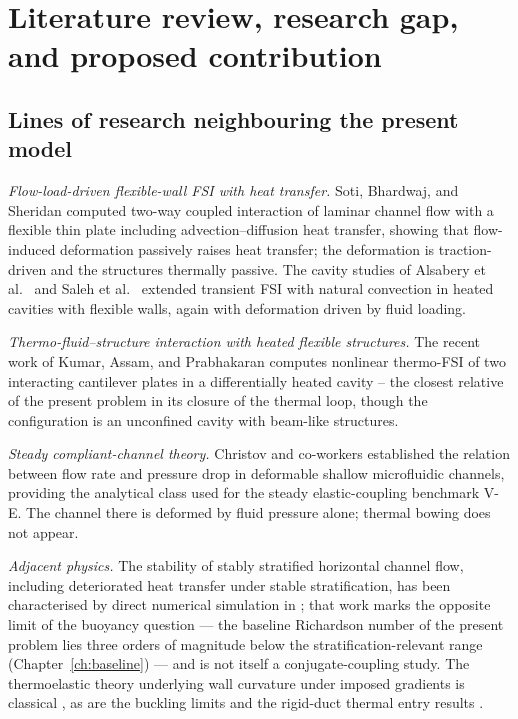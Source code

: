 \chapter{Literature review, research gap, and proposed contribution}
\label{ch:contribution}

\section{Lines of research neighbouring the present model}
\emph{Flow-load-driven flexible-wall FSI with heat transfer.}
Soti, Bhardwaj, and Sheridan \cite{soti2015steady} computed two-way coupled interaction of laminar
channel flow with a flexible thin plate including advection--diffusion heat transfer, showing that
flow-induced deformation passively raises heat transfer; the deformation is traction-driven and
the structures thermally passive. The cavity studies of Alsabery et al.\ \cite{alsabery2019numerical}
and Saleh et al.\ \cite{saleh2025laminar} extended transient FSI with natural convection in heated
cavities with flexible walls, again with deformation driven by fluid loading.

\emph{Thermo-fluid--structure interaction with heated flexible structures.}
The recent work of Kumar, Assam, and Prabhakaran \cite{kumar2026thermo} computes nonlinear
thermo-FSI of two interacting cantilever plates in a differentially heated cavity -- the closest
relative of the present problem in its closure of the thermal loop, though the configuration is
an unconfined cavity with beam-like structures.

\emph{Steady compliant-channel theory.}
Christov and co-workers \cite{christov2018flow} established the relation between flow rate and
pressure drop in deformable shallow microfluidic channels, providing the analytical class used for
the steady elastic-coupling benchmark V-E. The channel there is deformed by fluid pressure
alone; thermal bowing does not appear.

\emph{Adjacent physics.}
The stability of stably stratified horizontal channel flow, including deteriorated heat transfer
under stable stratification, has been characterised by direct numerical simulation in
\cite{draskic2025stability}; that work marks the opposite limit of the buoyancy question --- the
baseline Richardson number of the present problem lies three orders of magnitude below the
stratification-relevant range (Chapter~\ref{ch:baseline}) --- and is not itself a
conjugate-coupling study. The thermoelastic theory
underlying wall curvature under imposed gradients is classical
\cite{boley1960theory,timoshenko1970elasticity}, as are the buckling limits
\cite{timoshenko1961stability} and the rigid-duct thermal entry results \cite{shah1978laminar}.

